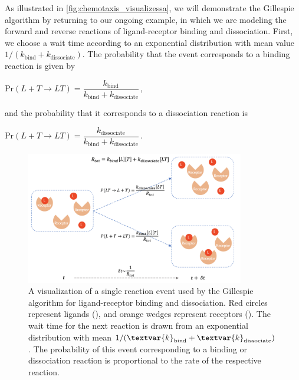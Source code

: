 \begin{qbox}\end{qbox}

As illustrated in \autoref{fig:chemotaxis_visualizessa}, we will demonstrate the Gillespie algorithm by returning to our ongoing example, in which we are modeling the forward and reverse reactions of ligand-receptor binding and dissociation. First, we choose a wait time according to an exponential distribution with mean value $1/(k_\text{bind} + k_\text{dissociate})$. The probability that the event corresponds to a binding reaction is given by

\begin{center}
$\mathrm{Pr}(L + T \rightarrow LT) = \dfrac{k_\text{bind}}{k_\text{bind} + k_\text{dissociate}}$\,,
\end{center}

\noindent and the probability that it corresponds to a dissociation reaction is

\begin{center}
$\mathrm{Pr}(L + T \rightarrow LT) = \dfrac{k_\text{dissociate}}{k_\text{bind} + k_\text{dissociate}}$\,.
\end{center}

\begin{figure}[h]
\centering
\mySfFamily
\includegraphics[width = 0.85\textwidth]{../images/chemotaxis_visualizessa.png}
\caption{A visualization of a single reaction event used by the Gillespie algorithm for ligand-receptor binding and dissociation. Red circles represent ligands (), and orange wedges represent receptors (). The wait time for the next reaction is drawn from an exponential distribution with mean $\text{1}/(\textvar{k}_\text{bind} + \textvar{k}_\text{dissociate})$. The probability of this event corresponding to a binding or dissociation reaction is proportional to the rate of the respective reaction.}
\label{fig:chemotaxis_visualizessa}
\end{figure}

